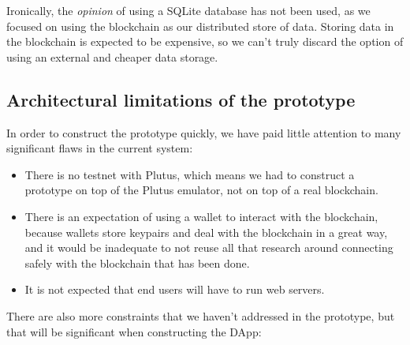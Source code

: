 \documentclass{article}
\begin{document}
Ironically, the \emph{opinion} of using a SQLite database has not been used, as we focused on using the blockchain as our distributed store of data. Storing data in the blockchain is expected to be expensive\cite{transaction-fees}, so we can't truly discard the option of using an external and cheaper data storage.

\subsection{Architectural limitations of the prototype}

In order to construct the prototype quickly, we have paid little attention to many significant flaws in the current system:

\begin{itemize}
  \item There is no testnet with Plutus, which means we had to construct a prototype on top of the Plutus emulator, not on top of a real blockchain.
  \item There is an expectation of using a wallet to interact with the blockchain, because wallets store keypairs and deal with the blockchain in a great way, and it would be inadequate to not reuse all that research around connecting safely with the blockchain that has been done.
  \item It is not expected that end users will have to run web servers.
\end{itemize}

There are also more constraints that we haven't addressed in the prototype, but that will be significant when constructing the DApp:
\end{document}
